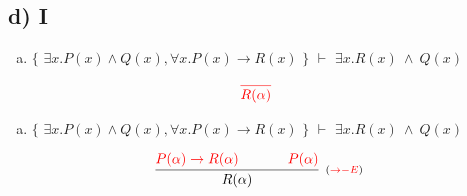 \documentclass[aspectratio=43]{beamer}
\begin{document}
    \subsection{d) I}
    
    \begin{frame}[fragile]
    
    	\begin{enumerate}[d)]
			\item $\{$ $\exists x.P(x)\land Q(x), \forall x.P(x)\to R(x)$ $\}$ $\vdash$ $\exists x.R(x)\ \land\ Q(x) $\\
		\end{enumerate}
        
        \vspace{80pt}
        
        \[
        \begin{array}{c}
		
        	\textcolor{red}{
            \infer[_{}]
            	{R(\alpha)}
            	{}
        	}
		\end{array}
        \]
        
	\end{frame}
    
    \begin{frame}[fragile]
    
    	\begin{enumerate}[d)]
			\item $\{$ $\exists x.P(x)\land Q(x), \forall x.P(x)\to R(x)$ $\}$ $\vdash$ $\exists x.R(x)\ \land\ Q(x) $\\
		\end{enumerate}
        
        \vspace{75pt}
        
        \[
        \begin{array}{c}
		
        	\infer[_{(\textcolor{red}{\to -E})}]
            	{R(\alpha)}
            	{\textcolor{red}{P(\alpha) \rightarrow R(\alpha)} \hspace{35pt} \textcolor{red}{P(\alpha)}}
		\end{array}
        \]
        
	\end{frame}
    
    
    
\end{document}

